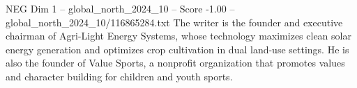 \begin{textsample}{NEG Dim 1 – global\_north\_2024\_10 – Score -1.00 – global\_north\_2024\_10/116865284.txt}
The writer is the founder and executive chairman of Agri-Light Energy Systems, whose technology maximizes clean solar energy generation and optimizes crop cultivation in dual land-use settings.
He is also the founder of Value Sports, a nonprofit organization that promotes values and character building for children and youth sports.

\end{textsample}
